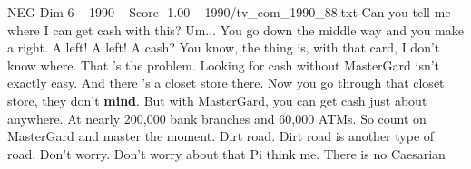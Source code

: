 \begin{textsample}{NEG Dim 6 – 1990 – Score -1.00 – 1990/tv\_com\_1990\_88.txt}  \label{ex:f6_neg_030}
Can you tell me where I can get cash with this?
Um...
You go down the middle way and you make a right.
A left!
A left!
A cash?
You know, the thing is, with that card, I don't know where.
That 's the problem.
Looking for cash without MasterGard isn't exactly easy.
And there 's a closet store there.
Now you go through that closet store, they don't \textbf{mind}.
But with MasterGard, you can get cash just about anywhere.
At nearly 200,000 bank branches and 60,000 ATMs.
So count on MasterGard and master the moment.
Dirt road.
Dirt road is another type of road.
Don't worry.
Don't worry about that Pi think me.
There is no Caesarian

\end{textsample}
